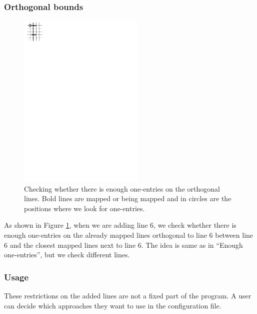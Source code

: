 \subsubsection{Orthogonal bounds}
\begin{figure}[h!]
\centering
\includegraphics[width=60mm]{../img/orthogonal.pdf}
\caption{Checking whether there is enough one-entries on the orthogonal lines. Bold lines are mapped or being mapped and in circles are the positions where we look for one-entries.}
\label{orthogonal}
\end{figure}
As shown in Figure \ref{orthogonal}, when we are adding line 6, we check whether there is enough one-entries on the already mapped lines orthogonal to line 6 between line 6 and the closest mapped lines next to line 6. The idea is same as in ``Enough one-entries'', but we check different lines.

\subsubsection{Usage}
These restrictions on the added lines are not a fixed part of the program. A user can decide which approaches they want to use in the configuration file.

